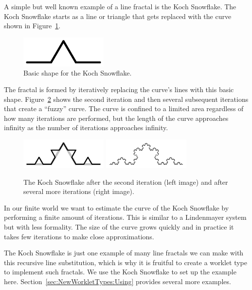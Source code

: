 A simple but well known example of a line fractal is the Koch Snowflake.
The Koch Snowflake starts as a line or triangle that gets replaced with the curve shown in Figure~\ref{fig:KochShape}.

\begin{figure}[htb]
  \centering
  \includegraphics[scale=2]{images/Koch1.pdf}
  \caption{Basic shape for the Koch Snowflake.}
  \label{fig:KochShape}
\end{figure}

The fractal is formed by iteratively replacing the curve's lines with this basic shape.
Figure~\ref{fig:KochIterations} shows the second iteration and then several subsequent iterations that create a ``fuzzy'' curve.
The curve is confined to a limited area regardless of how many iterations are performed, but the length of the curve approaches infinity as the number of iterations approaches infinity.

\begin{figure}[htb]
  \centering
  \includegraphics[scale=2]{images/Koch2.pdf}
  \includegraphics[scale=2]{images/Koch5.pdf}
  \caption[The Koch Snowflake after multiple iterations.]{
    The Koch Snowflake after the second iteration (left image) and after several more iterations (right image).
  }
  \label{fig:KochIterations}
\end{figure}

In our finite world we want to estimate the curve of the Koch Snowflake by performing a finite amount of iterations.
This is similar to a Lindenmayer system but with less formality.
The size of the curve grows quickly and in practice it takes few iterations to make close approximations.

\begin{didyouknow}
  The Koch Snowflake is just one example of many line fractals we can make with this recursive line substitution, which is why it is fruitful to create a worklet type to implement such fractals.
  We use the Koch Snowflake to set up the example here.
  Section~\ref{sec:NewWorkletTypes:Using} provides several more examples.
\end{didyouknow}

